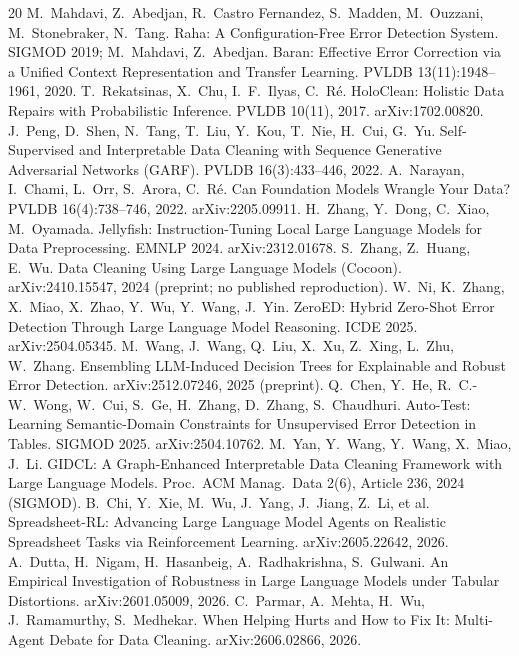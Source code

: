 \documentclass[11pt]{article}
\begin{document}
\begin{thebibliography}{20}
 M.~Mahdavi, Z.~Abedjan, R.~Castro Fernandez, S.~Madden, M.~Ouzzani,
M.~Stonebraker, N.~Tang. Raha: A Configuration-Free Error Detection System. SIGMOD
2019; M.~Mahdavi, Z.~Abedjan. Baran: Effective Error Correction via a Unified Context
Representation and Transfer Learning. PVLDB 13(11):1948--1961, 2020.
 T.~Rekatsinas, X.~Chu, I.~F.~Ilyas, C.~R\'e. HoloClean: Holistic
Data Repairs with Probabilistic Inference. PVLDB 10(11), 2017. arXiv:1702.00820.
 J.~Peng, D.~Shen, N.~Tang, T.~Liu, Y.~Kou, T.~Nie, H.~Cui, G.~Yu.
Self-Supervised and Interpretable Data Cleaning with Sequence Generative Adversarial
Networks (GARF). PVLDB 16(3):433--446, 2022.
 A.~Narayan, I.~Chami, L.~Orr, S.~Arora, C.~R\'e. Can Foundation
Models Wrangle Your Data? PVLDB 16(4):738--746, 2022. arXiv:2205.09911.
 H.~Zhang, Y.~Dong, C.~Xiao, M.~Oyamada. Jellyfish:
Instruction-Tuning Local Large Language Models for Data Preprocessing. EMNLP 2024.
arXiv:2312.01678.
 S.~Zhang, Z.~Huang, E.~Wu. Data Cleaning Using Large Language Models
(Cocoon). arXiv:2410.15547, 2024 (preprint; no published reproduction).
 W.~Ni, K.~Zhang, X.~Miao, X.~Zhao, Y.~Wu, Y.~Wang, J.~Yin. ZeroED:
Hybrid Zero-Shot Error Detection Through Large Language Model Reasoning. ICDE 2025.
arXiv:2504.05345.
 M.~Wang, J.~Wang, Q.~Liu, X.~Xu, Z.~Xing, L.~Zhu, W.~Zhang.
Ensembling LLM-Induced Decision Trees for Explainable and Robust Error Detection.
arXiv:2512.07246, 2025 (preprint).
 Q.~Chen, Y.~He, R.~C.-W.~Wong, W.~Cui, S.~Ge, H.~Zhang, D.~Zhang,
S.~Chaudhuri. Auto-Test: Learning Semantic-Domain Constraints for Unsupervised Error
Detection in Tables. SIGMOD 2025. arXiv:2504.10762.
 M.~Yan, Y.~Wang, Y.~Wang, X.~Miao, J.~Li. GIDCL: A Graph-Enhanced
Interpretable Data Cleaning Framework with Large Language Models. Proc.\ ACM Manag.\
Data 2(6), Article 236, 2024 (SIGMOD).
 B.~Chi, Y.~Xie, M.~Wu, J.~Yang, J.~Jiang, Z.~Li, et al.
Spreadsheet-RL: Advancing Large Language Model Agents on Realistic Spreadsheet Tasks
via Reinforcement Learning. arXiv:2605.22642, 2026.
 A.~Dutta, H.~Nigam, H.~Hasanbeig, A.~Radhakrishna, S.~Gulwani.
An Empirical Investigation of Robustness in Large Language Models under Tabular
Distortions. arXiv:2601.05009, 2026.
 C.~Parmar, A.~Mehta, H.~Wu, J.~Ramamurthy, S.~Medhekar. When Helping
Hurts and How to Fix It: Multi-Agent Debate for Data Cleaning. arXiv:2606.02866, 2026.

\end{thebibliography}
\end{document}
